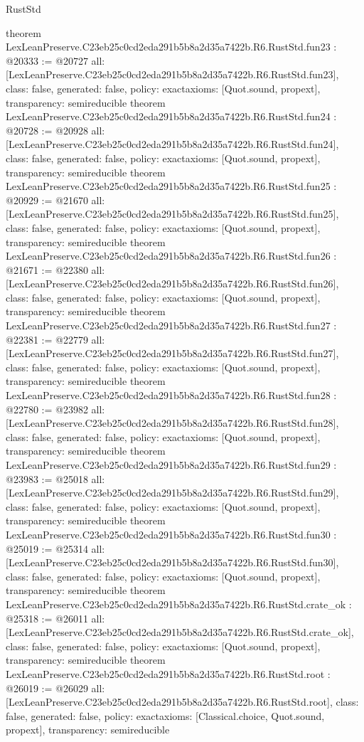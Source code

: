 \begin{lexlean}{RustStd}
\begin{coremodule}
{}
theorem LexLeanPreserve.C23eb25c0cd2eda291b5b8a2d35a7422b.R6.RustStd.fun23 : @20333 := @20727 {
  all: [LexLeanPreserve.C23eb25c0cd2eda291b5b8a2d35a7422b.R6.RustStd.fun23],
  class: false,
  generated: false,
  policy: exact{axioms: [Quot.sound, propext]},
  transparency: semireducible
}
theorem LexLeanPreserve.C23eb25c0cd2eda291b5b8a2d35a7422b.R6.RustStd.fun24 : @20728 := @20928 {
  all: [LexLeanPreserve.C23eb25c0cd2eda291b5b8a2d35a7422b.R6.RustStd.fun24],
  class: false,
  generated: false,
  policy: exact{axioms: [Quot.sound, propext]},
  transparency: semireducible
}
theorem LexLeanPreserve.C23eb25c0cd2eda291b5b8a2d35a7422b.R6.RustStd.fun25 : @20929 := @21670 {
  all: [LexLeanPreserve.C23eb25c0cd2eda291b5b8a2d35a7422b.R6.RustStd.fun25],
  class: false,
  generated: false,
  policy: exact{axioms: [Quot.sound, propext]},
  transparency: semireducible
}
theorem LexLeanPreserve.C23eb25c0cd2eda291b5b8a2d35a7422b.R6.RustStd.fun26 : @21671 := @22380 {
  all: [LexLeanPreserve.C23eb25c0cd2eda291b5b8a2d35a7422b.R6.RustStd.fun26],
  class: false,
  generated: false,
  policy: exact{axioms: [Quot.sound, propext]},
  transparency: semireducible
}
theorem LexLeanPreserve.C23eb25c0cd2eda291b5b8a2d35a7422b.R6.RustStd.fun27 : @22381 := @22779 {
  all: [LexLeanPreserve.C23eb25c0cd2eda291b5b8a2d35a7422b.R6.RustStd.fun27],
  class: false,
  generated: false,
  policy: exact{axioms: [Quot.sound, propext]},
  transparency: semireducible
}
theorem LexLeanPreserve.C23eb25c0cd2eda291b5b8a2d35a7422b.R6.RustStd.fun28 : @22780 := @23982 {
  all: [LexLeanPreserve.C23eb25c0cd2eda291b5b8a2d35a7422b.R6.RustStd.fun28],
  class: false,
  generated: false,
  policy: exact{axioms: [Quot.sound, propext]},
  transparency: semireducible
}
theorem LexLeanPreserve.C23eb25c0cd2eda291b5b8a2d35a7422b.R6.RustStd.fun29 : @23983 := @25018 {
  all: [LexLeanPreserve.C23eb25c0cd2eda291b5b8a2d35a7422b.R6.RustStd.fun29],
  class: false,
  generated: false,
  policy: exact{axioms: [Quot.sound, propext]},
  transparency: semireducible
}
theorem LexLeanPreserve.C23eb25c0cd2eda291b5b8a2d35a7422b.R6.RustStd.fun30 : @25019 := @25314 {
  all: [LexLeanPreserve.C23eb25c0cd2eda291b5b8a2d35a7422b.R6.RustStd.fun30],
  class: false,
  generated: false,
  policy: exact{axioms: [Quot.sound, propext]},
  transparency: semireducible
}
theorem LexLeanPreserve.C23eb25c0cd2eda291b5b8a2d35a7422b.R6.RustStd.crate_ok : @25318 := @26011 {
  all: [LexLeanPreserve.C23eb25c0cd2eda291b5b8a2d35a7422b.R6.RustStd.crate_ok],
  class: false,
  generated: false,
  policy: exact{axioms: [Quot.sound, propext]},
  transparency: semireducible
}
theorem LexLeanPreserve.C23eb25c0cd2eda291b5b8a2d35a7422b.R6.RustStd.root : @26019 := @26029 {
  all: [LexLeanPreserve.C23eb25c0cd2eda291b5b8a2d35a7422b.R6.RustStd.root],
  class: false,
  generated: false,
  policy: exact{axioms: [Classical.choice, Quot.sound, propext]},
  transparency: semireducible
}


\end{coremodule}
\end{lexlean}
